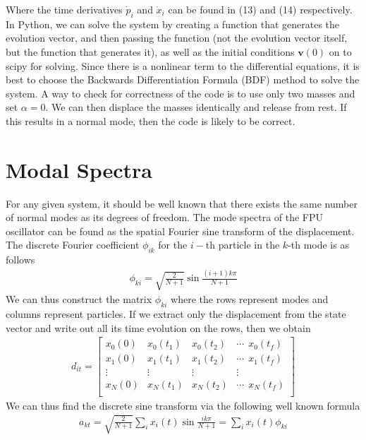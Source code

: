 \documentclass{article}
\newcommand{\ve}{\mathbf}
\begin{document}
Where the time derivatives $\dot{p}_i$ and $\dot{x}_i$ can be found in (13) and (14) respectively. In Python, 
we can solve the system by creating a function that generates the evolution vector, 
and then passing the function (not the evolution vector itself, but the function that generates it), as well as the initial conditions 
$\ve{v}(0)$ on to 
scipy for solving. Since there is a nonlinear term to the differential equations, 
it is best to choose the Backwards Differentiation Formula (BDF) method to solve the system. 
A way to check for correctness of the code is to use only two masses and set 
$\alpha=0$. We can then 
displace the masses identically and release from rest. If this results in a normal mode, then the code is likely to be correct.

\section{Modal Spectra}
For any given system, it should be well known that there exists the same number of normal modes 
as its degrees of freedom. The mode spectra of the FPU oscillator can be found as the spatial Fourier sine 
transform of the displacement. The discrete Fourier coefficient $\phi_{ik}$ for the 
$i-$th particle in the $k$-th mode is as follows
\begin{align}
    \phi_{ki}=\sqrt{\frac{2}{N+1}}\sin\frac{(i+1)k\pi}{N+1}
\end{align}
We can thus construct the matrix $\phi_{ki}$ where the rows represent modes and 
columns represent particles. If we extract only the displacement from the state vector
and write out all its time evolution on the rows, then we obtain 
\begin{align}
    d_{it}=\begin{bmatrix}
        x_0(0)& x_0(t_1) & x_0(t_2) &\cdots \ \  x_0(t_f)\\ 
        x_1(0)& x_1(t_1) & x_1(t_2) &\cdots \ \  x_1(t_f)\\ 
       \vdots& \vdots & \vdots & \vdots\\ 
        x_N(0)& x_N(t_1) & x_N(t_2) &\cdots \ \ x_N(t_f)\\ 
    \end{bmatrix}
\end{align} 
We can thus find the discrete sine transform via the following well known formula 
\begin{align}
    a_{kt}=\sqrt{\frac{2}{N+1}}\sum_ix_i(t)\sin{\frac{ik\pi}{N+1}}=\sum_ix_{i}(t)\phi_{ki}
\end{align}
\end{document}

